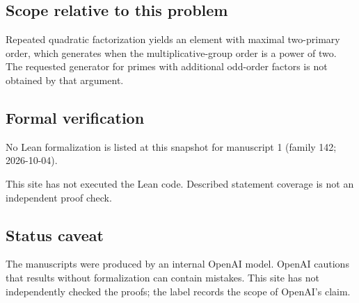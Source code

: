 \documentclass[11pt]{article}
\begin{document}
\subsection{Scope relative to this problem}
Repeated quadratic factorization yields an element with maximal two-primary order, which generates when the multiplicative-group order is a power of two. The requested generator for primes with additional odd-order factors is not obtained by that argument.

\subsection{Formal verification}
No Lean formalization is listed at this snapshot for manuscript 1 (family 142; 2026-10-04).

This site has not executed the Lean code. Described statement coverage is not an independent proof check.

\subsection{Status caveat}
The manuscripts were produced by an internal OpenAI model. OpenAI cautions that results without formalization can contain mistakes. This site has not independently checked the proofs; the label records the scope of OpenAI's claim.
\end{document}
